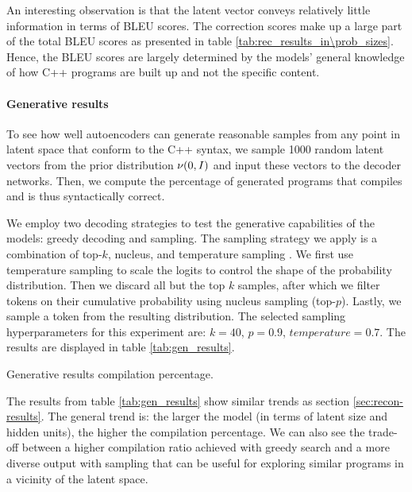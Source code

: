 An interesting observation is that the latent vector conveys relatively little information in terms of BLEU scores. The correction scores make up a large part of the total BLEU scores as presented in table \ref{tab:rec_results_in\prob_sizes}. Hence, the BLEU scores are largely determined by the models' general knowledge of how C++ programs are built up and not the specific content.

\paragraph{Generative results}
\label{results:gen}
To see how well autoencoders can generate reasonable samples from any point in latent space that conform to the C++ syntax, we sample 1000 random latent vectors from the prior distribution $\nu(0, I)$ and input these vectors to the decoder networks. Then, we compute the percentage of generated programs that compiles and is thus syntactically correct.



We employ two decoding strategies to test the generative capabilities of the models: greedy decoding and sampling. The sampling strategy we apply is a combination of top-$k$, nucleus, and temperature sampling \cite{holtzman2019curious}. 
We first use temperature sampling to scale the logits to control the shape of the probability distribution. Then we discard all but the top $k$ samples, after which we filter tokens on their cumulative probability using nucleus sampling (top-$p$). Lastly, we sample a token from the resulting distribution. The selected sampling hyperparameters for this experiment are: $k=40$, $p=0.9$, $temperature=0.7$. The results are displayed in table \ref{tab:gen_results}.

\begin{table}
\centering

\caption{Generative results compilation percentage.}
\label{tab:gen_results}
\end{table}




The results from table \ref{tab:gen_results} show similar trends as section \ref{sec:recon-results}. 
The general trend is: the larger the model (in terms of latent size and hidden units), the higher the compilation percentage. 
We can also see the trade-off between a higher compilation ratio achieved with greedy search and a more diverse output with sampling that can be useful for exploring similar programs in a vicinity of the latent space.

